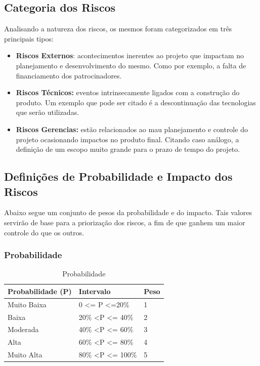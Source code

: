 \subsection{Categoria dos Riscos}
Analisando a natureza dos riscos, os mesmos foram categorizados em três principais tipos:

\begin{itemize}
\item \textbf{Riscos Externos}: acontecimentos inerentes ao projeto que impactam no planejamento e desenvolvimento do mesmo. Como por exemplo, a falta de financiamento dos patrocinadores.
\item \textbf{Riscos Técnicos:} eventos intrinsecamente ligados com a construção do produto. Um exemplo que pode ser citado é a descontinuação das tecnologias que serão utilizadas.
\item \textbf{Riscos Gerencias:} estão relacionados ao mau planejamento e controle do projeto ocasionando impactos no produto final. Citando caso análogo, a definição de um escopo muito grande para o prazo de tempo do projeto.
\end{itemize}

\subsection{Definições de Probabilidade e Impacto dos Riscos}

Abaixo segue um conjunto de pesos da probabilidade e do impacto. Tais valores servirão de base para a priorização dos riscos, a fim de que ganhem um maior controle do que os outros.

\subsubsection{Probabilidade}

\begin{table}[h]
\centering
\caption{Probabilidade}
\label{probabilidade}
\begin{tabular}{|l|l|l|}
\hline
\textbf{Probabilidade (P)} & \textbf{Intervalo} & \textbf{Peso}\\  \hline
Muito Baixa       & 0 \textless= P \textless=20\%     & 1    \\
Baixa             & 20\% \textless P \textless= 40\%  & 2    \\
Moderada          & 40\% \textless P \textless= 60\%  & 3    \\ 
Alta              & 60\% \textless P \textless= 80\%  & 4    \\ 
Muito Alta        & 80\% \textless P \textless= 100\% & 5    \\ 
\hline
\end{tabular}
\end{table}

